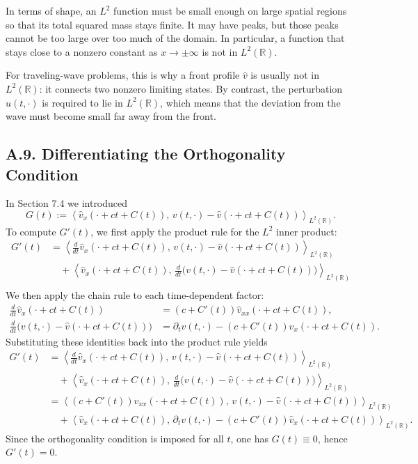 \documentclass[11pt]{article}
\theoremstyle{definition}
\theoremstyle{remark}
\begin{document}
In terms of shape, an $L^2$ function must be small enough on large spatial regions so that its total squared mass stays finite. It may have peaks, but those peaks cannot be too large over too much of the domain. In particular, a function that stays close to a nonzero constant as $x\to\pm\infty$ is not in $L^2(\mathbb R)$.

For traveling-wave problems, this is why a front profile $\hat v$ is usually not in $L^2(\mathbb R)$: it connects two nonzero limiting states. By contrast, the perturbation $u(t,\cdot)$ is required to lie in $L^2(\mathbb R)$, which means that the deviation from the wave must become small far away from the front.

\subsection*{A.9. Differentiating the Orthogonality Condition}
In Section 7.4 we introduced
\[
G(t):=\left\langle \hat v_x(\cdot+ct+C(t)),\,v(t,\cdot)-\hat v(\cdot+ct+C(t))\right\rangle_{L^2(\mathbb R)}.
\]
To compute $G'(t)$, we first apply the product rule for the $L^2$ inner product:
\begin{align*}
G'(t)
&=
\left\langle \frac{d}{dt}\hat v_x(\cdot+ct+C(t)),\,v(t,\cdot)-\hat v(\cdot+ct+C(t))\right\rangle_{L^2(\mathbb R)} \\
&\quad +
\left\langle \hat v_x(\cdot+ct+C(t)),\,\frac{d}{dt}\bigl(v(t,\cdot)-\hat v(\cdot+ct+C(t))\bigr)\right\rangle_{L^2(\mathbb R)} \\
 \end{align*}
We then apply the chain rule to each time-dependent factor:
\begin{align*}
\frac{d}{dt}\hat v_x(\cdot+ct+C(t))
&=
(c+C'(t))\hat v_{xx}(\cdot+ct+C(t)), \\
\frac{d}{dt}\bigl(v(t,\cdot)-\hat v(\cdot+ct+C(t))\bigr)
&=
\partial_t v(t,\cdot)-(c+C'(t))\hat v_x(\cdot+ct+C(t)).
\end{align*}
Substituting these identities back into the product rule yields
\begin{align*}
G'(t)
&=
\left\langle \frac{d}{dt}\hat v_x(\cdot+ct+C(t)),\,v(t,\cdot)-\hat v(\cdot+ct+C(t))\right\rangle_{L^2(\mathbb R)} \\
&\quad +
\left\langle \hat v_x(\cdot+ct+C(t)),\,\frac{d}{dt}\bigl(v(t,\cdot)-\hat v(\cdot+ct+C(t))\bigr)\right\rangle_{L^2(\mathbb R)} \\
&=
\left\langle (c+C'(t))\hat v_{xx}(\cdot+ct+C(t)),\,v(t,\cdot)-\hat v(\cdot+ct+C(t))\right\rangle_{L^2(\mathbb R)} \\
&\quad +
\left\langle \hat v_x(\cdot+ct+C(t)),\,\partial_t v(t,\cdot)-(c+C'(t))\hat v_x(\cdot+ct+C(t))\right\rangle_{L^2(\mathbb R)}.
\end{align*}
Since the orthogonality condition is imposed for all $t$, one has $G(t)\equiv 0$, hence $G'(t)=0$.
\end{document}
